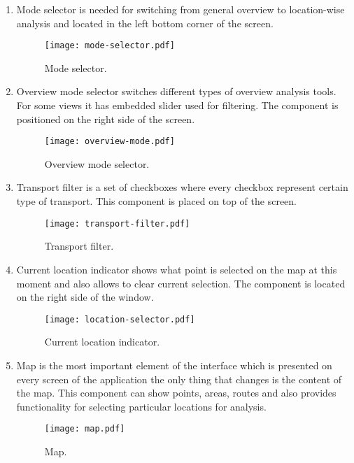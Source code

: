 \begin{enumerate}
  \item Mode selector is needed for switching from general overview to location-wise analysis and
  located in the left bottom corner of the screen.

  \begin{figure}[ht]
    \centering
    \texttt{[image: mode-selector.pdf]}
    \caption{Mode selector.}
    \label{pic:mode_selector}
  \end{figure}

  \item Overview mode selector switches different types of overview analysis tools. For some
  views it has embedded slider used for filtering. The component is positioned on the right
  side of the screen.

  \begin{figure}[ht]
    \centering
    \texttt{[image: overview-mode.pdf]}
    \caption{Overview mode selector.}
    \label{pic:overview_selector}
  \end{figure}

  \item Transport filter is a set of checkboxes where every checkbox represent certain
  type of transport. This component is placed on top of the screen.

  \begin{figure}[ht]
    \centering
    \texttt{[image: transport-filter.pdf]}
    \caption{Transport filter.}
    \label{pic:transport_filter}
  \end{figure}

  \item Current location indicator shows what point is selected on the map at this moment and
  also allows to clear current selection. The component is located on the right side of the window.

  \begin{figure}[ht]
    \centering
    \texttt{[image: location-selector.pdf]}
    \caption{Current location indicator.}
    \label{pic:transport_filter}
  \end{figure}

  \item Map is the most important element of the interface which is presented on every screen
  of the application the only thing that changes is the content of the map.
  This component can show points, areas, routes and also provides functionality for
  selecting particular locations for analysis.

  \begin{figure}[ht]
    \centering
    \texttt{[image: map.pdf]}
    \caption{Map.}
    \label{pic:map}
  \end{figure}

\end{enumerate}

